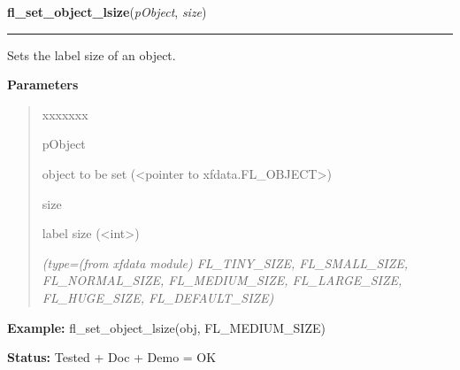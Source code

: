     \label{xformslib:library:fl_set_object_lsize}

    \vspace{0.5ex}

\hspace{.8\funcindent}\begin{boxedminipage}{\funcwidth}

    \raggedright \textbf{fl\_set\_object\_lsize}(\textit{pObject}, \textit{size})

    \vspace{-1.5ex}

    \rule{\textwidth}{0.5\fboxrule}
\setlength{\parskip}{2ex}
    Sets the label size of an object.

\setlength{\parskip}{1ex}
      \textbf{Parameters}
      \vspace{-1ex}

      \begin{quote}
        \begin{Ventry}{xxxxxxx}

          \item[pObject]

          object to be set ({\textless}pointer to 
          xfdata.FL\_OBJECT{\textgreater})

          \item[size]

          label size ({\textless}int{\textgreater})

            {\it (type=(from xfdata module) FL\_TINY\_SIZE, FL\_SMALL\_SIZE, FL\_NORMAL\_SIZE, 
FL\_MEDIUM\_SIZE, FL\_LARGE\_SIZE, FL\_HUGE\_SIZE, FL\_DEFAULT\_SIZE)}

        \end{Ventry}

      \end{quote}

\textbf{Example:} fl\_set\_object\_lsize(obj, FL\_MEDIUM\_SIZE)



\textbf{Status:} Tested + Doc + Demo = OK



    \end{boxedminipage}

    \label{xformslib:library:fl_get_object_lsize}

